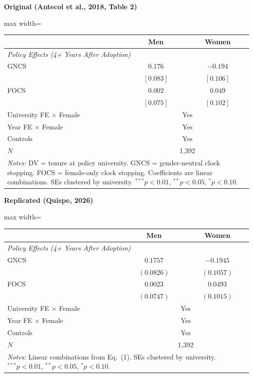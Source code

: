 \documentclass[11pt,a4paper]{article}
\begin{document}
\vspace{0.5cm}
\begin{minipage}[t]{0.48\textwidth}
\centering
\textbf{\large Original (Antecol et al., 2018, Table 2)}
\vspace{0.3cm}

\begin{adjustbox}{max width=\textwidth}
\begin{tabular}{lcc}
\toprule
 & Men & Women \\
\midrule
\multicolumn{3}{l}{\textit{Policy Effects (4+ Years After Adoption)}} \\[3pt]
GNCS & $0.176$ & $-0.194$ \\
 & $[0.083]$ & $[0.106]$ \\[0.3em]
FOCS & $0.002$ & $0.049$ \\
 & $[0.075]$ & $[0.102]$ \\[0.3em]
\midrule
University FE $\times$ Female & \multicolumn{2}{c}{Yes} \\
Year FE $\times$ Female & \multicolumn{2}{c}{Yes} \\
Controls & \multicolumn{2}{c}{Yes} \\
$N$ & \multicolumn{2}{c}{1,392} \\
\bottomrule
\multicolumn{3}{p{0.95\textwidth}}{\footnotesize\textit{Notes:} DV = tenure at policy university. GNCS = gender-neutral clock stopping. FOCS = female-only clock stopping. Coefficients are linear combinations. SEs clustered by university. $^{***}p<0.01$, $^{**}p<0.05$, $^{*}p<0.10$.}
\end{tabular}
\end{adjustbox}
\end{minipage}%
\hfill
\begin{minipage}[t]{0.48\textwidth}
\centering
\textbf{\large Replicated (Quispe, 2026)}
\vspace{0.3cm}

\begin{adjustbox}{max width=\textwidth}
\begin{tabular}{lcc}
\toprule
 & Men & Women \\
\midrule
\multicolumn{3}{l}{\textit{Policy Effects (4+ Years After Adoption)}} \\[3pt]
GNCS & $0.1757$ & $-0.1945$ \\
 & $(0.0826)$ & $(0.1057)$ \\[0.3em]
FOCS & $0.0023$ & $0.0493$ \\
 & $(0.0747)$ & $(0.1015)$ \\[0.3em]
\midrule
University FE $\times$ Female & \multicolumn{2}{c}{Yes} \\
Year FE $\times$ Female & \multicolumn{2}{c}{Yes} \\
Controls & \multicolumn{2}{c}{Yes} \\
$N$ & \multicolumn{2}{c}{1,392} \\
\bottomrule
\multicolumn{3}{p{0.95\textwidth}}{\footnotesize\textit{Notes:} Linear combinations from Eq.\ (1). SEs clustered by university. $^{***}p<0.01$, $^{**}p<0.05$, $^{*}p<0.10$.}
\end{tabular}
\end{adjustbox}
\end{minipage}
\end{document}
